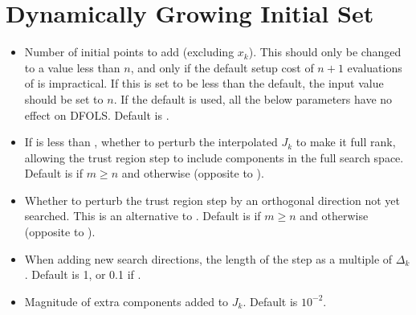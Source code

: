\documentclass[letterpaper,10pt,english]{sphinxmanual}
\begin{document}
\section{Dynamically Growing Initial Set}
\label{\detokenize{advanced:dynamically-growing-initial-set}}\begin{itemize}
\item {} 
\sphinxAtStartPar
{} \sphinxhyphen{} Number of initial points to add (excluding \(x_k\)). This should only be changed to a value less than \(n\), and only if the default setup cost of \(n+1\) evaluations of  is impractical. If this is set to be less than the default, the input value  should be set to \(n\). If the default is used, all the below parameters have no effect on DFO\sphinxhyphen{}LS. Default is .

\item {} 
\sphinxAtStartPar
{} \sphinxhyphen{} If  is less than , whether to perturb the interpolated \(J_k\) to make it full rank, allowing the trust region step to include components in the full search space. Default is  if \(m\geq n\) and  otherwise (opposite to ).

\item {} 
\sphinxAtStartPar
{} \sphinxhyphen{} Whether to perturb the trust region step by an orthogonal direction not yet searched. This is an alternative to . Default is  if \(m\geq n\) and  otherwise (opposite to ).

\item {} 
\sphinxAtStartPar
{} \sphinxhyphen{} When adding new search directions, the length of the step as a multiple of \(\Delta_k\). Default is 1, or 0.1 if .

\item {} 
\sphinxAtStartPar
{} \sphinxhyphen{} Magnitude of extra components added to \(J_k\). Default is \(10^{-2}\).


\end{itemize}
\end{document}
